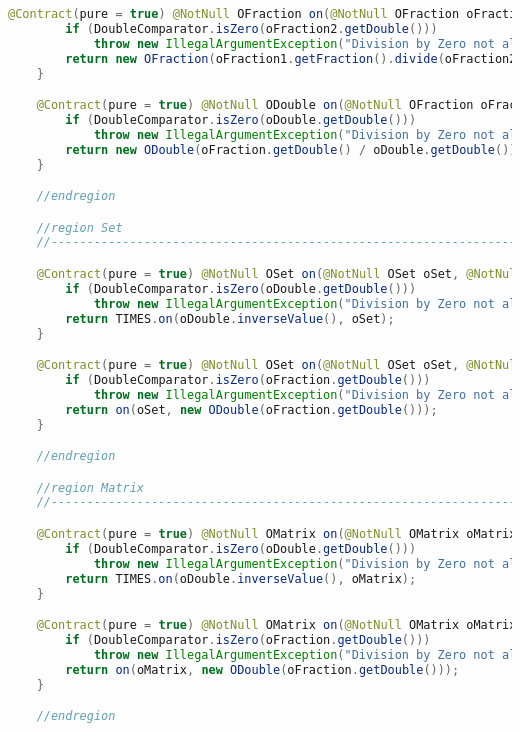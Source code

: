\begin{lstlisting}[caption=Slash (Falk),label=list:Slash,language=Java]
    @Contract(pure = true) @NotNull OFraction on(@NotNull OFraction oFraction1, @NotNull OFraction oFraction2) {
        if (DoubleComparator.isZero(oFraction2.getDouble()))
            throw new IllegalArgumentException("Division by Zero not allowed");
        return new OFraction(oFraction1.getFraction().divide(oFraction2.getFraction()));
    }

    @Contract(pure = true) @NotNull ODouble on(@NotNull OFraction oFraction, @NotNull ODouble oDouble) {
        if (DoubleComparator.isZero(oDouble.getDouble()))
            throw new IllegalArgumentException("Division by Zero not allowed");
        return new ODouble(oFraction.getDouble() / oDouble.getDouble());
    }

    //endregion

    //region Set
    //------------------------------------------------------------------------------------

    @Contract(pure = true) @NotNull OSet on(@NotNull OSet oSet, @NotNull ODouble oDouble) {
        if (DoubleComparator.isZero(oDouble.getDouble()))
            throw new IllegalArgumentException("Division by Zero not allowed");
        return TIMES.on(oDouble.inverseValue(), oSet);
    }

    @Contract(pure = true) @NotNull OSet on(@NotNull OSet oSet, @NotNull OFraction oFraction) {
        if (DoubleComparator.isZero(oFraction.getDouble()))
            throw new IllegalArgumentException("Division by Zero not allowed");
        return on(oSet, new ODouble(oFraction.getDouble()));
    }

    //endregion

    //region Matrix
    //------------------------------------------------------------------------------------

    @Contract(pure = true) @NotNull OMatrix on(@NotNull OMatrix oMatrix, @NotNull ODouble oDouble) {
        if (DoubleComparator.isZero(oDouble.getDouble()))
            throw new IllegalArgumentException("Division by Zero not allowed");
        return TIMES.on(oDouble.inverseValue(), oMatrix);
    }

    @Contract(pure = true) @NotNull OMatrix on(@NotNull OMatrix oMatrix, @NotNull OFraction oFraction) {
        if (DoubleComparator.isZero(oFraction.getDouble()))
            throw new IllegalArgumentException("Division by Zero not allowed");
        return on(oMatrix, new ODouble(oFraction.getDouble()));
    }

    //endregion


\end{lstlisting}
